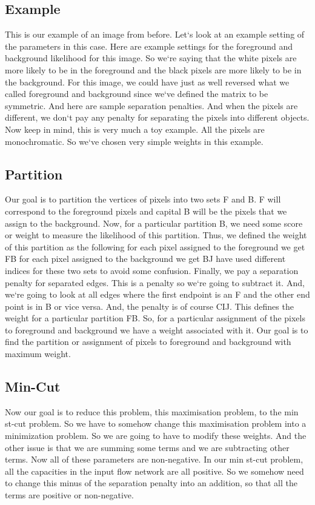 \subsection{Example}
This is our example of an image from before.
Let`s look at an example setting of the parameters in this case.
Here are example settings for the foreground and background likelihood for this image.
So we`re saying that the white pixels are more likely to be in the foreground and the black pixels are more likely to be in the background.
For this image, we could have just as well reversed what we called foreground and background since we`ve defined the matrix to be symmetric.
And here are sample separation penalties.
And when the pixels are different, we don`t pay any penalty for separating the pixels into different objects.
Now keep in mind, this is very much a toy example.
All the pixels are monochromatic.
So we`ve chosen very simple weights in this example.

\subsection{Partition}
Our goal is to partition the vertices of pixels into two sets F and B\@.
F will correspond to the foreground pixels and capital B will be the pixels that we assign to the background.
Now, for a particular partition B, we need some score or weight to measure the likelihood of this partition.
Thus, we defined the weight of this partition as the following for each pixel assigned to the foreground we get FB for each pixel assigned to the background we get BJ have used different indices for these two sets to avoid some confusion.
Finally, we pay a separation penalty for separated edges.
This is a penalty so we`re going to subtract it.
And, we`re going to look at all edges where the first endpoint is an F and the other end point is in B or vice versa.
And, the penalty is of course CIJ\@.
This defines the weight for a particular partition FB\@.
So, for a particular assignment of the pixels to foreground and background we have a weight associated with it.
Our goal is to find the partition or assignment of pixels to foreground and background with maximum weight.

\subsection{Min-Cut}
Now our goal is to reduce this problem, this maximisation problem, to the min st-cut problem.
So we have to somehow change this maximisation problem into a minimization problem.
So we are going to have to modify these weights.
And the other issue is that we are summing some terms and we are subtracting other terms.
Now all of these parameters are non-negative.
In our min st-cut problem, all the capacities in the input flow network are all positive.
So we somehow need to change this minus of the separation penalty into an addition, so that all the terms are positive or non-negative.

